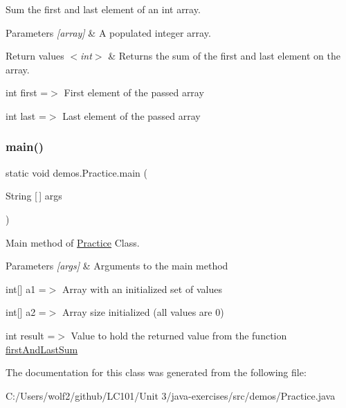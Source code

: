 Sum the first and last element of an int array. 
\begin{DoxyParams}{Parameters}
{\em \mbox{[}array\mbox{]}} & A populated integer array. \\
\hline
\end{DoxyParams}

\begin{DoxyRetVals}{Return values}
{\em $<$int$>$} & Returns the sum of the first and last element on the array. \\
\hline
\end{DoxyRetVals}
int first =$>$ First element of the passed array

int last =$>$ Last element of the passed array \mbox{\label{classdemos_1_1_practice_a532e88a74010a5527495460a783b8a75}} 
\subsubsection{\texorpdfstring{main()}{main()}}
{\footnotesize\ttfamily static void demos.\+Practice.\+main (\begin{DoxyParamCaption}\item[{String \mbox{[}$\,$\mbox{]}}]{args }\end{DoxyParamCaption})\hspace{0.3cm}{\ttfamily [static]}}

Main method of \mbox{\hyperlink{classdemos_1_1_practice}{Practice}} Class. 
\begin{DoxyParams}{Parameters}
{\em \mbox{[}args\mbox{]}} & Arguments to the main method \\
\hline
\end{DoxyParams}
int\mbox{[}\mbox{]} a1 =$>$ Array with an initialized set of values

int\mbox{[}\mbox{]} a2 =$>$ Array size initialized (all values are 0)

int result =$>$ Value to hold the returned value from the function \mbox{\hyperlink{classdemos_1_1_practice_a19ed9e7b2a95cdc9a8a03dc76289e6a5}{first\+And\+Last\+Sum}} 

The documentation for this class was generated from the following file\+:\begin{DoxyCompactItemize}
\item 
C\+:/\+Users/wolf2/github/\+L\+C101/\+Unit 3/java-\/exercises/src/demos/Practice.\+java\end{DoxyCompactItemize}

